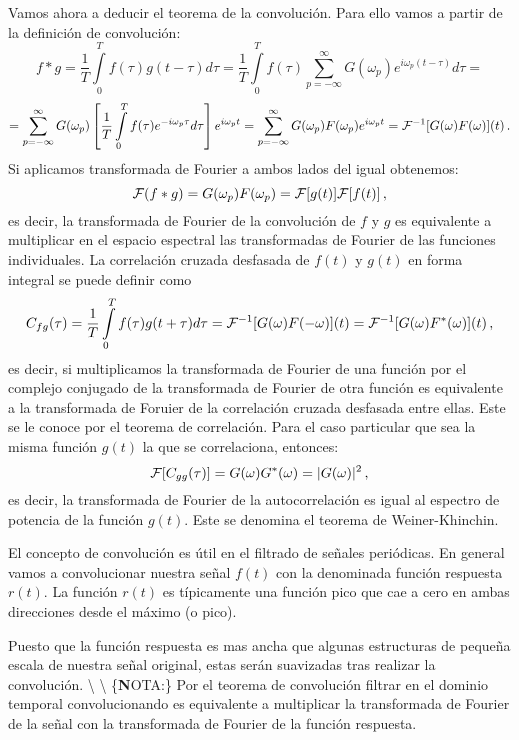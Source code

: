 \documentclass[
]{agujournal2019}
\begin{document}
Vamos ahora a deducir el teorema de la convolución. Para ello vamos a
partir de la definición de convolución:
\[f*g=\frac{1}{T}\int\limits^{T}_{0}f(\tau)g(t-\tau) d\tau=
      \frac{1}{T}\int\limits^{T}_{0}f(\tau)\sum\limits^{\infty}_{p=-\infty} G(\omega_p) e^{i\omega_p (t-\tau)} d\tau=\]
\[=\sum\limits^{\infty}_{p=-\infty} G(\omega_p) \left[\frac{1}{T}\int\limits^{T}_{0}f(\tau)e^{-i\omega_p \tau} d\tau \right]
e^{i\omega_p t}=\sum\limits^{\infty}_{p=-\infty} G(\omega_p)F(\omega_p)e^{i\omega_p t}={\cal F}^{-1}[G(\omega)F(\omega)](t)\,.\]
Si aplicamos transformada de Fourier a ambos lados del igual obtenemos:
\[{\cal F}(f*g)=G(\omega_p)F(\omega_p)={\cal F}[g(t)]{\cal F}[f(t)]\,,\]
es decir, la transformada de Fourier de la convolución de \(f\) y \(g\)
es equivalente a multiplicar en el espacio espectral las transformadas
de Fourier de las funciones individuales. La correlación cruzada
desfasada de \(f(t)\) y \(g(t)\) en forma integral se puede definir como
\[C_{fg}(\tau)=\frac{1}{T}\int\limits^{T}_{0} f(\tau) g(t+\tau) d\tau={\cal F}^{-1}[G(\omega)F(-\omega)](t)=
{\cal F}^{-1}[G(\omega)F^*(\omega)](t)\,,\] es decir, si multiplicamos
la transformada de Fourier de una función por el complejo conjugado de
la transformada de Fourier de otra función es equivalente a la
transformada de Foruier de la correlación cruzada desfasada entre ellas.
Este se le conoce por el teorema de correlación. Para el caso particular
que sea la misma función \(g(t)\) la que se correlaciona, entonces:
\[{\cal F}[C_{gg}(\tau)]=G(\omega)G^*(\omega)=|G(\omega)|^2\,,\] es
decir, la transformada de Fourier de la autocorrelación es igual al
espectro de potencia de la función \(g(t)\). Este se denomina el teorema
de Weiner-Khinchin.

El concepto de convolución es útil en el filtrado de señales periódicas.
En general vamos a convolucionar nuestra señal \(f(t)\) con la
denominada función respuesta \(r(t)\). La función \(r(t)\) es
típicamente una función pico que cae a cero en ambas direcciones desde
el máximo (o pico).

\begin{center}
\end{center}

Puesto que la función respuesta es mas ancha que algunas estructuras de
pequeña escala de nuestra señal original, estas serán suavizadas tras
realizar la convolución. \textbackslash{} \textbackslash{}
\{\textbf NOTA:\} Por el teorema de convolución filtrar en el dominio
temporal convolucionando es equivalente a multiplicar la transformada de
Fourier de la señal con la transformada de Fourier de la función
respuesta.
\end{document}
